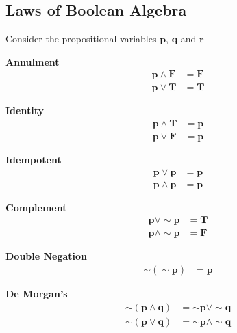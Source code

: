 \subsection{Laws of Boolean Algebra}\label{mod1:section:BooleanAlgebraLaws}



\noindent Consider the propositional variables $\boldsymbol{p}$, $\boldsymbol{q}$ and $\boldsymbol{r}$


\begin{law}\label{mod1:law:Annulment}
   \textbf{Annulment}
   \begin{align}
      \boldsymbol{p \land F} &= \boldsymbol{F}  \\
      \boldsymbol{p \lor T} &= \boldsymbol{T}
   \end{align}
\end{law}


\begin{law}\label{mod1:law:Identity}
   \textbf{Identity}
   \begin{align}
      \boldsymbol{p \land T} &= \boldsymbol{p}  \\
      \boldsymbol{p \lor F} &= \boldsymbol{p}
   \end{align}
\end{law}

\begin{law}\label{mod1:law:Idempotent}
   \textbf{Idempotent}
   \begin{align}
      \boldsymbol{p \lor p} &= \boldsymbol{p}\\
      \boldsymbol{p \land p} &= \boldsymbol{p}
   \end{align}
\end{law}

\begin{law}\label{mod1:law:Complement}
   \textbf{Complement}
   \begin{align}
      \boldsymbol{p \lor \sim p} &= \boldsymbol{T}\\
      \boldsymbol{p \land \sim p} &= \boldsymbol{F}
   \end{align}
\end{law}

\begin{law}\label{mod1:law:DoubleNegation}
   \textbf{Double Negation}
   \begin{align}
      \boldsymbol{\sim(\sim p)} &= \boldsymbol{p}
   \end{align}
\end{law}

\begin{law}\label{mod1:law:DeMorgan}
   \textbf{De Morgan's}
   \begin{align}
      \boldsymbol{\sim (p \land q)} &= \boldsymbol{\sim p \lor \sim q} \\
      \boldsymbol{\sim (p \lor q)} &= \boldsymbol{\sim p \land \sim q}
   \end{align}
\end{law}

